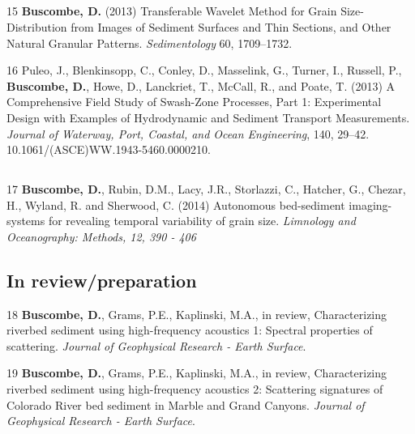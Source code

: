 \documentclass[margin,line]{resume}
\begin{document}
\begin{resume}
\begin{footnotesize}
	\subsection{}
	\begin{list1}
        \item[15] {\bf Buscombe, D.} (2013) Transferable Wavelet Method for Grain Size-Distribution from Images of Sediment Surfaces and Thin Sections, and Other Natural Granular Patterns. {\sl Sedimentology} 60, 1709--1732. \\

        \item[16] Puleo, J., Blenkinsopp, C., Conley, D., Masselink, G., Turner, I., Russell, P., {\bf Buscombe, D.}, Howe, D., Lanckriet, T., McCall, R., and Poate, T. (2013) A Comprehensive Field Study of Swash-Zone Processes, Part 1: Experimental Design with Examples of Hydrodynamic and Sediment Transport Measurements. {\sl Journal of Waterway, Port, Coastal, and Ocean Engineering}, 140, 29–42. 10.1061/(ASCE)WW.1943-5460.0000210.
	\end{list1}

	\subsection{}
	\begin{list1}
	\item[17]  {\bf Buscombe, D.}, Rubin, D.M., Lacy, J.R., Storlazzi, C., Hatcher, G., Chezar, H., Wyland, R. and Sherwood, C. (2014) Autonomous bed-sediment imaging-systems for revealing temporal variability of grain size. {\sl Limnology and Oceanography: Methods, 12, 390 - 406}

	\end{list1}

	\subsection{\mysidestyle In review/preparation}
	\begin{list1}
	\item[18] {\bf Buscombe, D.}, Grams, P.E., Kaplinski, M.A., in review, Characterizing riverbed sediment using high-frequency acoustics 1: Spectral properties of scattering. {\sl Journal of Geophysical Research - Earth Surface}.\\

	\item[19] {\bf Buscombe, D.}, Grams, P.E., Kaplinski, M.A., in review, Characterizing riverbed sediment using high-frequency acoustics 2: Scattering signatures of Colorado River bed sediment in Marble and Grand Canyons. {\sl Journal of Geophysical Research - Earth Surface}.\\


\end{list1}
\end{footnotesize}
\end{resume}
\end{document}
